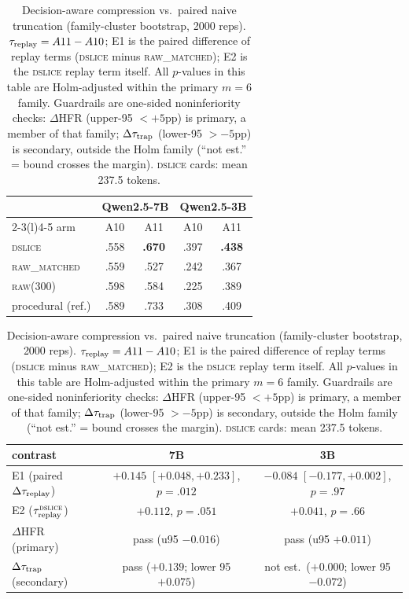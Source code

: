 \begin{table}[t]
\centering\small
\caption{Decision-aware compression vs.\ paired naive truncation (family-cluster bootstrap, 2000 reps). $\tau_{\mathrm{replay}}=A11-A10$; E1 is the paired difference of replay terms (\textsc{dslice} minus \textsc{raw\_matched}); E2 is the \textsc{dslice} replay term itself. All $p$-values in this table are Holm-adjusted within the primary $m=6$ family. Guardrails are one-sided noninferiority checks: $\Delta$HFR (upper-95 $<+5$pp) is primary, a member of that family; $\Delta\tau_{\mathrm{trap}}$ (lower-95 $>-5$pp) is secondary, outside the Holm family (``not est.'' = bound crosses the margin). \textsc{dslice} cards: mean 237.5 tokens.}
\label{tab:hdc}
\begin{tabular}{lcc|cc}
\toprule
& \multicolumn{2}{c}{Qwen2.5-7B} & \multicolumn{2}{c}{Qwen2.5-3B} \\
\cmidrule(r){2-3}\cmidrule(l){4-5}
arm & A10 & A11 & A10 & A11 \\
\midrule
\textsc{dslice}      & .558 & \textbf{.670} & .397 & \textbf{.438} \\
\textsc{raw\_matched}& .559 & .527 & .242 & .367 \\
\textsc{raw(300)}    & .598 & .584 & .225 & .389 \\
procedural (ref.)    & .589 & .733 & .308 & .409 \\
\bottomrule
\end{tabular}

\vspace{2pt}
\begin{tabular}{lcc}
\toprule
contrast & 7B & 3B \\
\midrule
E1 (paired $\Delta\tau_{\mathrm{replay}}$)
  & $\mathbf{+0.145}$ $[+0.048,+0.233]$, $p=.012$
  & $-0.084$ $[-0.177,+0.002]$, $p=.97$ \\
E2 ($\tau_{\mathrm{replay}}^{\textsc{dslice}}$)
  & $+0.112$, $p=.051$ & $+0.041$, $p=.66$ \\
$\Delta$HFR (primary)
  & pass (u95 $-0.016$) & pass (u95 $+0.011$) \\
$\Delta\tau_{\mathrm{trap}}$ (secondary)
  & pass ($+0.139$; lower 95 $+0.075$) & not est.\ ($+0.000$; lower 95 $-0.072$) \\
\bottomrule
\end{tabular}
\end{table}

